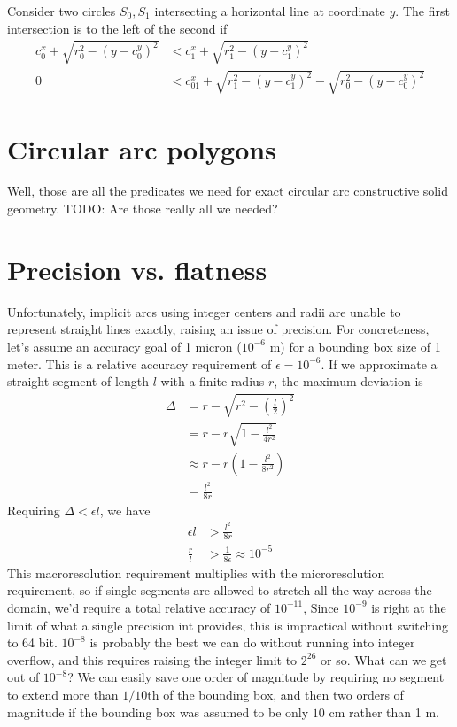 \documentclass[11pt]{article}
\newcommand{\TODO}{{\color{red} TODO}}
\begin{document}
Consider two circles $S_0, S_1$ intersecting a horizontal line at coordinate $y$.  The first intersection is to the left of the second if
\begin{align*}
c_0^x + \sqrt{r_0^2 - (y-c_0^y)^2} &< c_1^x + \sqrt{r_1^2 - (y-c_1^y)^2} \\
0 &< c_{01}^x + \sqrt{r_1^2 - (y-c_1^y)^2} - \sqrt{r_0^2 - (y-c_0^y)^2}
\end{align*}

\section{Circular arc polygons}

Well, those are all the predicates we need for exact circular arc constructive solid geometry.  \TODO: Are those really all we needed?

\section{Precision vs. flatness}

Unfortunately, implicit arcs using integer centers and radii are unable to represent straight lines exactly, raising an issue of precision.
For concreteness, let's assume an accuracy goal of 1 micron ($10^{-6}$ m) for a bounding box size of 1 meter.  This is a relative accuracy
requirement of $\epsilon = 10^{-6}$.  If we approximate a straight segment of length $l$ with a finite radius $r$, the maximum deviation is
\begin{align*}
\Delta &= r - \sqrt{r^2 - \left(\frac{l}{2}\right)^2} \\
       &= r - r \sqrt{1 - \frac{l^2}{4 r^2}} \\
       &\approx r - r \left(1 - \frac{l^2}{8 r^2} \right) \\
       &= \frac{l^2}{8 r}
\end{align*}
Requiring $\Delta < \epsilon l$, we have
\begin{align*}
\epsilon l &> \frac{l^2}{8 r} \\
\frac{r}{l} &> \frac{1}{8 \epsilon} \approx 10^{-5}
\end{align*}
This macroresolution requirement multiplies with the microresolution requirement, so if single segments are allowed to stretch all the way
across the domain, we'd require a total relative accuracy of $10^{-11}$,  Since $10^{-9}$ is right at the limit of what a single precision
int provides, this is impractical without switching to 64 bit.  $10^{-8}$ is probably the best we can do without running into integer overflow,
and this requires raising the integer limit to $2^{26}$ or so.  What can we get out of $10^{-8}$?  We can easily save one order of magnitude by
requiring no segment to extend more than $1/10$th of the bounding box, and then two orders of magnitude if the bounding box was assumed to be
only $10$ cm rather than 1 m.
\end{document}
